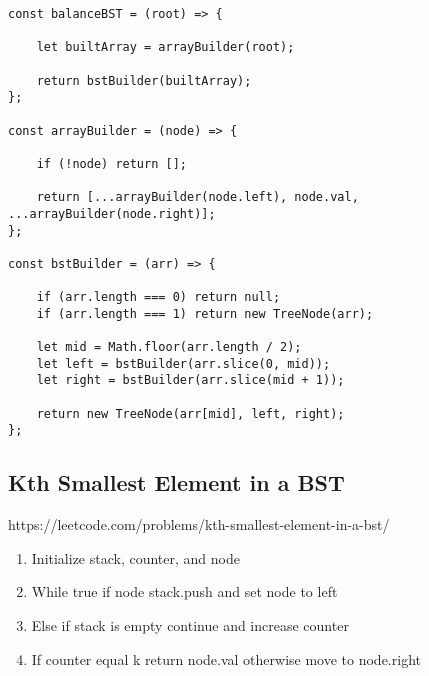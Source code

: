\documentclass[10pt]{article}
\begin{document}
\begin{lstlisting}[title=Solution balanceBST, captionpos=t]
const balanceBST = (root) => {
    
    let builtArray = arrayBuilder(root);
    
    return bstBuilder(builtArray);
};

const arrayBuilder = (node) => {
    
    if (!node) return [];
    
    return [...arrayBuilder(node.left), node.val, ...arrayBuilder(node.right)];
};

const bstBuilder = (arr) => {
    
    if (arr.length === 0) return null;
    if (arr.length === 1) return new TreeNode(arr);
    
    let mid = Math.floor(arr.length / 2);
    let left = bstBuilder(arr.slice(0, mid));
    let right = bstBuilder(arr.slice(mid + 1));
    
    return new TreeNode(arr[mid], left, right);
};
\end{lstlisting}
\medskip %


















\pagebreak
\medskip   
\subsection {Kth Smallest Element in a BST}
https://leetcode.com/problems/kth-smallest-element-in-a-bst/

\begin{enumerate}
	\item Initialize stack, counter, and node
	\item While true if node stack.push and set node to left
	\item Else if stack is empty continue and increase counter
	\item If counter equal k return node.val otherwise move to node.right

\end{enumerate}
\end{document}
